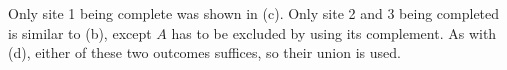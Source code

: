 \documentclass[letterpaper,12pt]{article}
\begin{document}
\begin{enumerate}
\begin{enumerate}
\begin{center}
{}
        \end{center}
        Only site 1 being complete was shown in (c). Only site 2 and 3 being completed is similar to (b), except $A$ has to be excluded by using its complement. As with (d), either of these two outcomes suffices, so their union is used.
    \end{enumerate}
\end{enumerate}
\end{document}
